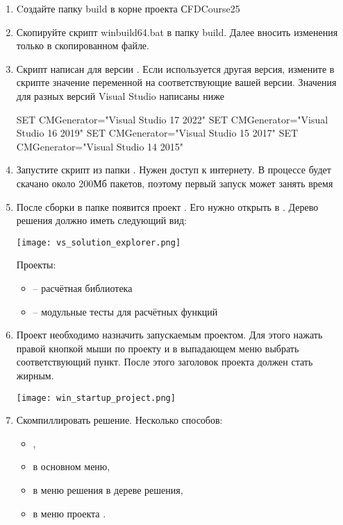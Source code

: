 \label{sec:vs-build}

\begin{enumerate}
\item
Cоздайте папку build в корне проекта СFDCourse25

\item
Скопируйте скрипт winbuild64.bat в папку build. Далее вносить изменения
только в скопированном файле.

\item
Скрипт написан для версии . Если используется другая версия,
измените в скрипте значение переменной  на соответствующие вашей версии.
Значения для разных версий Visual Studio написаны ниже
\begin{shelloutput}
SET CMGenerator="Visual Studio 17 2022"
SET CMGenerator="Visual Studio 16 2019"
SET CMGenerator="Visual Studio 15 2017"
SET CMGenerator="Visual Studio 14 2015"
\end{shelloutput}

\item
Запустите скрипт  из папки . Нужен доступ к интернету.
В процессе будет скачано около 200Мб пакетов, поэтому первый запуск может занять время

\item
После сборки в папке  появится проект  .
Его нужно открыть в .
Дерево решения должно иметь следующий вид:
\begin{center}
\texttt{[image: vs\_solution\_explorer.png]}
\end{center}
Проекты:
\begin{itemize}
\item {} -- расчётная библиотека
\item {} -- модульные тесты для расчётных функций
\end{itemize}

\item
Проект  необходимо назначить запускаемым проектом. Для этого нажать правой кнопкой мыши по проекту и в выпадающем меню
выбрать соответствующий пункт. После этого заголовок проекта должен стать жирным.
\begin{center}
\texttt{[image: win\_startup\_project.png]}
\end{center}

\item
Скомпиллировать решение. Несколько способов:
\begin{itemize}
\item {},
\item {} в основном меню,
\item {} в меню решения в дереве решения,
\item {} в меню проекта .
\end{itemize}


\end{enumerate}
